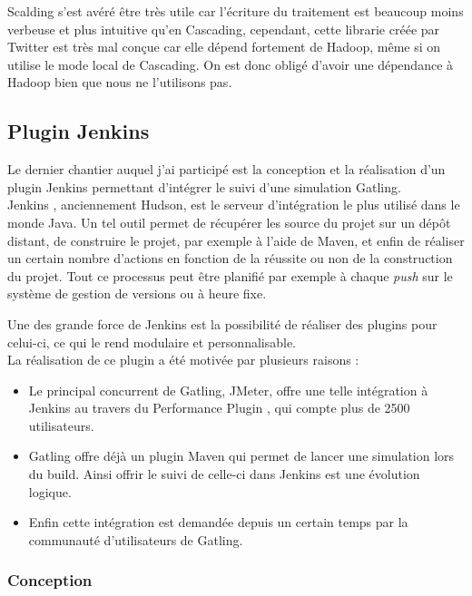 Scalding s'est avéré être très utile car l'écriture du traitement est beaucoup moins verbeuse et plus intuitive qu'en Cascading, cependant, cette librarie créée par Twitter est très mal conçue car elle dépend fortement de Hadoop, même si on utilise le mode local de Cascading. On est donc obligé d'avoir une dépendance à Hadoop bien que nous ne l'utilisons pas.

\subsection{Plugin Jenkins}

Le dernier chantier auquel j'ai participé est la conception et la réalisation d'un plugin Jenkins permettant d'intégrer le suivi d'une simulation Gatling.\\

Jenkins \cite{jenkins}, anciennement Hudson, est le serveur d'intégration le plus utilisé dans le monde Java. Un tel outil permet de récupérer les source du projet sur un dépôt distant, de construire le projet, par exemple à l'aide de Maven, et enfin de réaliser un certain nombre d'actions en fonction de la réussite ou non de la construction du projet. Tout ce processus peut être planifié par exemple à chaque \textit{push} sur le système de gestion de versions ou à heure fixe.

Une des grande force de Jenkins est la possibilité de réaliser des plugins pour celui-ci, ce qui le rend modulaire et personnalisable.\\ 

La réalisation de ce plugin a été motivée par plusieurs raisons :

\begin{itemize}
	\item Le principal concurrent de Gatling, JMeter, offre une telle intégration à Jenkins au travers du Performance Plugin \cite{perfplugin}, qui compte plus de 2500 utilisateurs.
	\item Gatling offre déjà un plugin Maven qui permet de lancer une simulation lors du build. Ainsi offrir le suivi de celle-ci dans Jenkins est une évolution logique.
	\item Enfin cette intégration est demandée depuis un certain temps par la communauté d'utilisateurs de Gatling.
\end{itemize}

\subsubsection{Conception}

